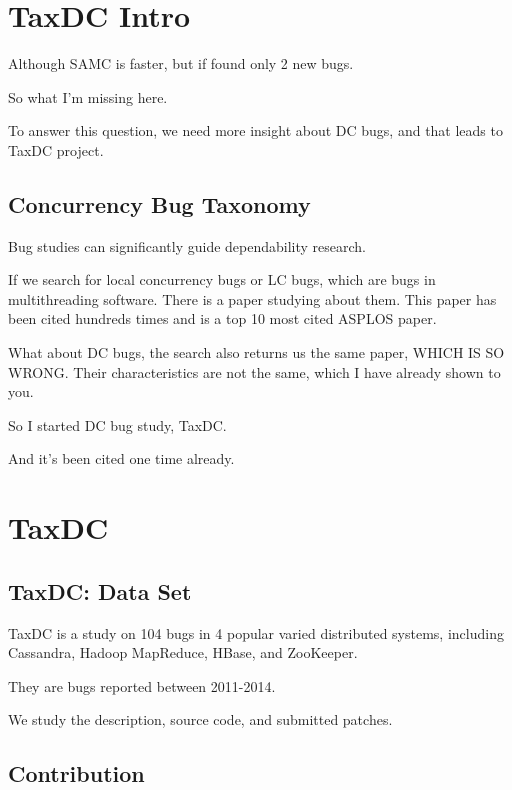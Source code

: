 \section{TaxDC Intro}


Although SAMC is faster, but if found only 2 new bugs.

So what I'm missing here.

To answer this question, we need more insight about DC bugs, and that leads to
TaxDC project.

\subsection{Concurrency Bug Taxonomy}

Bug studies can significantly guide dependability research. 

If we search for local concurrency bugs or LC bugs, which are bugs in
multithreading software. There is a paper studying about them. This paper has
been cited hundreds times and is a top 10 most cited ASPLOS paper.

What about DC bugs, the search also returns us the same paper, WHICH IS
SO WRONG. Their characteristics are not the same, which I have already shown to
you.

So I started DC bug study, TaxDC. 

And it's been cited one time already.

\section{TaxDC}


\subsection{TaxDC: Data Set}

TaxDC is a study on 104 bugs in 4 popular varied distributed systems, including
Cassandra, Hadoop MapReduce, HBase, and ZooKeeper.

They are bugs reported between 2011-2014.

We study the description, source code, and submitted patches.

\subsection{Contribution}

